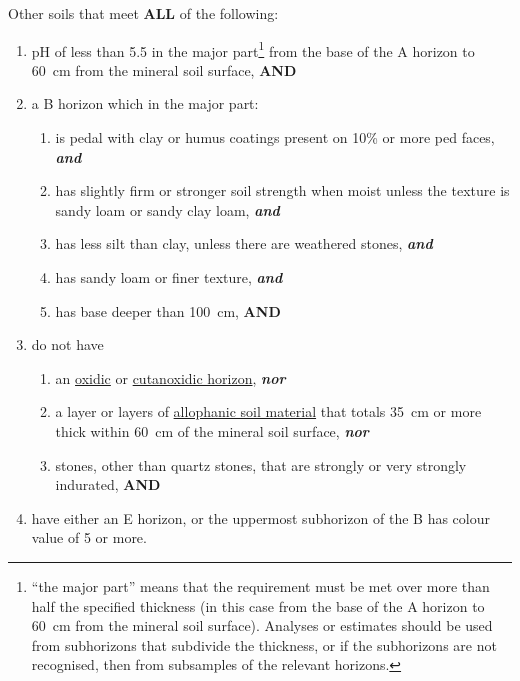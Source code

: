 \documentclass[
  letterpaper,
  DIV=11,
  numbers=noendperiod]{scrreprt}
\providecommand{\tightlist}{%
  \setlength{\itemsep}{0pt}\setlength{\parskip}{0pt}}\usepackage{longtable,booktabs,array}
\begin{document}
Other soils that meet \textbf{ALL} of the following:

\begin{enumerate}
\def\labelenumi{\arabic{enumi}.}
\tightlist
\item
  pH of less than 5.5 in the major part\footnote{``the major part''
    means that the requirement must be met over more than half the
    specified thickness (in this case from the base of the A horizon to
    60~cm from the mineral soil surface). Analyses or estimates should
    be used from subhorizons that subdivide the thickness, or if the
    subhorizons are not recognised, then from subsamples of the relevant
    horizons.} from the base of the A horizon to 60~cm from the mineral
  soil surface, \textbf{AND}
\item
  a B horizon which in the major part:

  \begin{enumerate}
  \def\labelenumii{(\alph{enumii})}
  \tightlist
  \item
    is pedal with clay or humus coatings present on 10\% or more ped
    faces, \textbf{\emph{and}}
  \item
    has slightly firm or stronger soil strength when moist unless the
    texture is sandy loam or sandy clay loam, \textbf{\emph{and}}
  \item
    has less silt than clay, unless there are weathered stones,
    \textbf{\emph{and}}
  \item
    has sandy loam or finer texture, \textbf{\emph{and}}
  \item
    has base deeper than 100~cm, \textbf{AND}
  \end{enumerate}
\item
  do not have

  \begin{enumerate}
  \def\labelenumii{(\alph{enumii})}
  \tightlist
  \item
    an \protect\hyperlink{sec-diag-oxh}{oxidic} or
    \protect\hyperlink{sec-diag-cutoxh}{cutanoxidic horizon},
    \textbf{\emph{nor}}
  \item
    a layer or layers of \protect\hyperlink{sec-diag-alloph}{allophanic
    soil material} that totals 35~cm or more thick within 60~cm of the
    mineral soil surface, \textbf{\emph{nor}}
  \item
    stones, other than quartz stones, that are strongly or very strongly
    indurated, \textbf{AND}
  \end{enumerate}
\item
  have either an E horizon, or the uppermost subhorizon of the B has
  colour value of 5 or more.
\end{enumerate}
\end{document}
